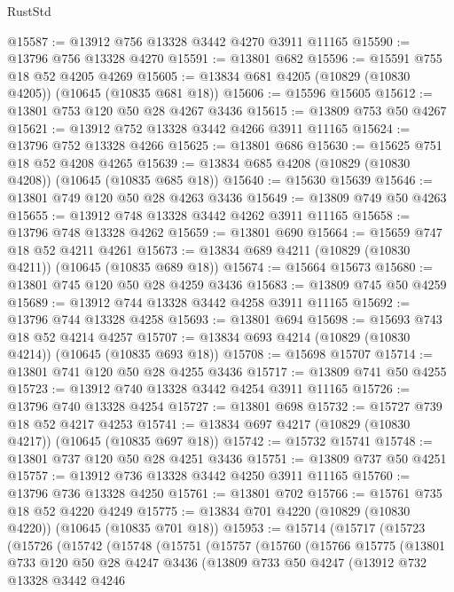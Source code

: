 \begin{lexlean}{RustStd}
\begin{coremodule}
@15587 := @13912 @756 @13328 @3442 @4270 @3911 @11165
@15590 := @13796 @756 @13328 @4270
@15591 := @13801 @682
@15596 := @15591 @755 @18 @52 @4205 @4269
@15605 := @13834 @681 @4205 (@10829 (@10830 @4205)) (@10645 (@10835 @681 @18))
@15606 := @15596 @15605
@15612 := @13801 @753 @120 @50 @28 @4267 @3436
@15615 := @13809 @753 @50 @4267
@15621 := @13912 @752 @13328 @3442 @4266 @3911 @11165
@15624 := @13796 @752 @13328 @4266
@15625 := @13801 @686
@15630 := @15625 @751 @18 @52 @4208 @4265
@15639 := @13834 @685 @4208 (@10829 (@10830 @4208)) (@10645 (@10835 @685 @18))
@15640 := @15630 @15639
@15646 := @13801 @749 @120 @50 @28 @4263 @3436
@15649 := @13809 @749 @50 @4263
@15655 := @13912 @748 @13328 @3442 @4262 @3911 @11165
@15658 := @13796 @748 @13328 @4262
@15659 := @13801 @690
@15664 := @15659 @747 @18 @52 @4211 @4261
@15673 := @13834 @689 @4211 (@10829 (@10830 @4211)) (@10645 (@10835 @689 @18))
@15674 := @15664 @15673
@15680 := @13801 @745 @120 @50 @28 @4259 @3436
@15683 := @13809 @745 @50 @4259
@15689 := @13912 @744 @13328 @3442 @4258 @3911 @11165
@15692 := @13796 @744 @13328 @4258
@15693 := @13801 @694
@15698 := @15693 @743 @18 @52 @4214 @4257
@15707 := @13834 @693 @4214 (@10829 (@10830 @4214)) (@10645 (@10835 @693 @18))
@15708 := @15698 @15707
@15714 := @13801 @741 @120 @50 @28 @4255 @3436
@15717 := @13809 @741 @50 @4255
@15723 := @13912 @740 @13328 @3442 @4254 @3911 @11165
@15726 := @13796 @740 @13328 @4254
@15727 := @13801 @698
@15732 := @15727 @739 @18 @52 @4217 @4253
@15741 := @13834 @697 @4217 (@10829 (@10830 @4217)) (@10645 (@10835 @697 @18))
@15742 := @15732 @15741
@15748 := @13801 @737 @120 @50 @28 @4251 @3436
@15751 := @13809 @737 @50 @4251
@15757 := @13912 @736 @13328 @3442 @4250 @3911 @11165
@15760 := @13796 @736 @13328 @4250
@15761 := @13801 @702
@15766 := @15761 @735 @18 @52 @4220 @4249
@15775 := @13834 @701 @4220 (@10829 (@10830 @4220)) (@10645 (@10835 @701 @18))
@15953 := @15714
    (@15717
      (@15723
        (@15726
          (@15742
            (@15748
              (@15751
                (@15757
                  (@15760
                    (@15766
                      @15775
                      (@13801
                        @733
                        @120
                        @50
                        @28
                        @4247
                        @3436
                        (@13809
                          @733
                          @50
                          @4247
                          (@13912
                            @732
                            @13328
                            @3442
                            @4246

\end{coremodule}
\end{lexlean}

